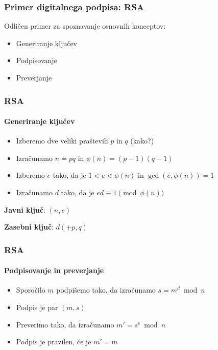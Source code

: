 \documentclass{beamer}    %
\begin{document}
\begin{frame}
    \frametitle{Primer digitalnega podpisa: RSA}
    Odličen primer za spoznavanje osnovnih konceptov:
    \vspace{1cm}
    \begin{itemize}
        \item Generiranje ključev
        \item Podpisovanje
        \item Preverjanje 
    \end{itemize}
\end{frame}

\begin{frame}
    \frametitle{RSA}
    \framesubtitle{Generiranje ključev}
    \begin{itemize}
        \item Izberemo dve \alert{veliki} praštevili $p$ in $q$ (kako?)
        \item Izračunamo $n = pq$ in $\phi(n) = (p-1)(q-1)$
        \item Izberemo $e$ tako, da je $1 < e < \phi(n)$ in $\gcd(e, \phi(n)) = 1$
        \item Izračunamo $d$ tako, da je $ed \equiv 1 \pmod{\phi(n)}$
    \end{itemize}
    \vspace{1cm}
    \begin{multicols*}{2}
        \textbf{Javni ključ}: $(n, e)$
        \columnbreak

        \textbf{Zasebni ključ}: $d (+ p, q)$
    \end{multicols*}
\end{frame}

\begin{frame}
    \frametitle{RSA}
    \framesubtitle{Podpisovanje in preverjanje}
    \begin{itemize}
        \item Sporočilo $m$ podpišemo tako, da izračunamo $s = m^d \bmod n$
        \item Podpis je par $(m, s)$
    \end{itemize}
    
    \vspace{1cm}
    \begin{itemize}
        \item Preverimo tako, da izračunamo $m' = s^e \bmod n$
        \item Podpis je pravilen, če je $m' = m$
    \end{itemize}
\end{frame}
\end{document}
